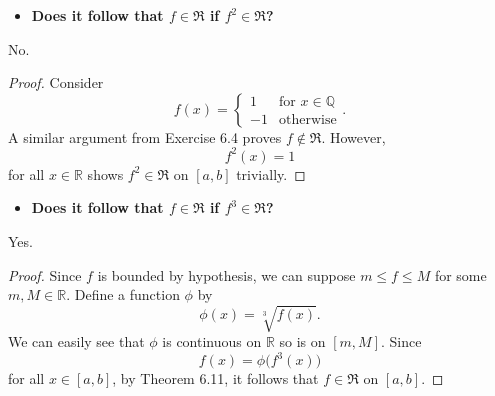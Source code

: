 \begin{Exercise}
	\begin{itemize}
		\item \textbf{Does it follow that $f\in\mathfrak{R}$ if $f^2\in\mathfrak{R}$?}
	\end{itemize}
	\begin{answer}
		No.
	\end{answer}
	\begin{proof}
		Consider
		$$
		f(x) = \begin{cases}
		1 & \mbox{for } x\in\mathbb{Q} \\
		-1 & \mbox{otherwise} 
		\end{cases}.
		$$
		A similar argument from Exercise 6.4 proves $f\notin\mathfrak{R}$.
		However, 
		$$
		f^2(x) = 1
		$$
		for all $x\in\mathbb{R}$ shows $f^2\in\mathfrak{R}$ on $[a,b]$ trivially.
	\end{proof}
	
	\begin{itemize}
		\item \textbf{Does it follow that $f\in\mathfrak{R}$ if $f^3\in\mathfrak{R}$?}
	\end{itemize}
	\begin{answer}
		Yes.
	\end{answer}
	\begin{proof}
		Since $f$ is bounded by hypothesis, we can suppose $m \leq f \leq M$ for some $m,M\in\mathbb{R}$.
		Define a function $\phi$ by
		$$
		\phi(x) = \sqrt[3]{f(x)}.
		$$
		We can easily see that $\phi$ is continuous on $\mathbb{R}$ so is on $[m,M]$.
		Since
		$$
		f(x) = \phi\big( f^3(x) \big)
		$$
		for all $x\in[a,b]$, by Theorem 6.11, it follows that $f\in\mathfrak{R}$ on $[a,b]$.
	\end{proof}
\end{Exercise}
